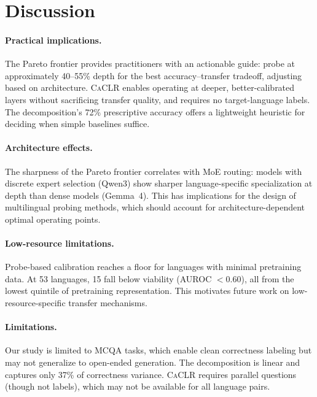 \documentclass[11pt,a4paper]{article}
\newcommand{\caclr}{\textsc{CaCLR}}
\begin{document}
\section{Discussion}

\paragraph{Practical implications.}
The Pareto frontier provides practitioners with an actionable guide: probe at approximately 40--55\% depth for the best accuracy--transfer tradeoff, adjusting based on architecture.
\caclr{} enables operating at deeper, better-calibrated layers without sacrificing transfer quality, and requires no target-language labels.
The decomposition's 72\% prescriptive accuracy offers a lightweight heuristic for deciding when simple baselines suffice.

\paragraph{Architecture effects.}
The sharpness of the Pareto frontier correlates with MoE routing: models with discrete expert selection (Qwen3) show sharper language-specific specialization at depth than dense models (Gemma~4).
This has implications for the design of multilingual probing methods, which should account for architecture-dependent optimal operating points.

\paragraph{Low-resource limitations.}
Probe-based calibration reaches a floor for languages with minimal pretraining data.
At 53 languages, 15 fall below viability (AUROC $< 0.60$), all from the lowest quintile of pretraining representation.
This motivates future work on low-resource-specific transfer mechanisms.

\paragraph{Limitations.}
Our study is limited to MCQA tasks, which enable clean correctness labeling but may not generalize to open-ended generation.
The decomposition is linear and captures only 37\% of correctness variance.
\caclr{} requires parallel questions (though not labels), which may not be available for all language pairs.
\end{document}
